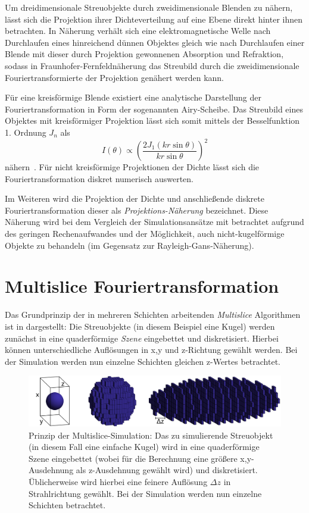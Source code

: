 Um dreidimensionale Streuobjekte durch zweidimensionale Blenden zu nähern, lässt sich die Projektion ihrer Dichteverteilung auf eine Ebene direkt hinter ihnen betrachten. In Näherung verhält sich eine elektromagnetische Welle nach Durchlaufen eines hinreichend dünnen Objektes gleich wie nach Durchlaufen einer Blende mit dieser durch Projektion gewonnenen Absorption und Refraktion, sodass in Fraunhofer-Fernfeldnäherung das Streubild durch die zweidimensionale Fouriertransformierte der Projektion genähert werden kann.
	
Für eine kreisförmige Blende existiert eine analytische Darstellung der Fouriertransformation in Form der sogenannten Airy-Scheibe. Das Streubild eines Objektes mit kreisförmiger Projektion lässt sich somit mittels der Besselfunktion 1. Ordnung $J_n$ als
\begin{equation}
	I(\theta) \propto \left ( \frac{2 J_1(kr \sin \theta)}{kr \sin \theta} \right )^2 
\end{equation}
nähern~\cite{born1980}. Für nicht kreisförmige Projektionen der Dichte lässt sich die Fouriertransformation diskret numerisch auswerten.

Im Weiteren wird die Projektion der Dichte und anschließende diskrete Fouriertransformation dieser als \textit{Projektions-Näherung} bezeichnet. Diese Näherung wird bei dem Vergleich der Simulationsansätze mit betrachtet aufgrund des geringen Rechenaufwandes und der Möglichkeit, auch nicht-kugelförmige Objekte zu behandeln (im Gegensatz zur Rayleigh-Gans-Näherung).


\section{Multislice Fouriertransformation}
Das Grundprinzip der in mehreren Schichten arbeitenden \textit{Multislice} Algorithmen ist in  dargestellt: Die Streuobjekte (in diesem Beispiel eine Kugel) werden zunächst in eine quaderförmige \textit{Szene} eingebettet und diskretisiert. Hierbei können unterschiedliche Auflösungen in x,y und z-Richtung gewählt werden. Bei der Simulation werden nun einzelne Schichten gleichen z-Wertes betrachtet.
\begin{figure}
	\centering
	\includegraphics[width=1\textwidth]{images/multislice_sphere.png}
	\caption[Prinzip Multislice]{Prinzip der Multislice-Simulation: Das zu simulierende Streuobjekt (in diesem Fall eine einfache Kugel) wird in eine quaderförmige Szene eingebettet (wobei für die Berechnung eine größere x,y-Ausdehnung als z-Ausdehnung gewählt wird) und diskretisiert. Üblicherweise wird hierbei eine feinere Auflösung $\Delta z$ in Strahlrichtung gewählt. Bei der Simulation werden nun einzelne Schichten betrachtet.}
	\label{fig:multislice_prinzip}
\end{figure} 

